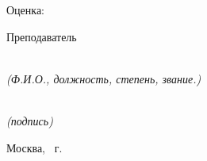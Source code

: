 \begin{titlepage}
    \noindent
    Оценка:~~~\underline{\makebox[3cm]{\vphantom{text}}}

    \vspace{0.5cm}

    \noindent
    \begin{minipage}[t]{0.17\textwidth}
        Преподаватель
    \end{minipage}
    \begin{minipage}[t]{0.7\textwidth}
        \centering
        \underline{\makebox[12cm]{\teacher}} \\
        {\small\textit{(Ф.И.О., должность, степень, звание.)}}
    \end{minipage}
    \hfill
    \begin{minipage}[t]{0.1\textwidth}
        \centering
        \underline{\makebox[2cm]{\vphantom{\teacher}}} \\
        {\small\textit{(подпись)}}
    \end{minipage}
    \vfil

    \enlargethispage{3cm}
    \centering
    \small Москва, \yearFooter~г.

\end{titlepage}
